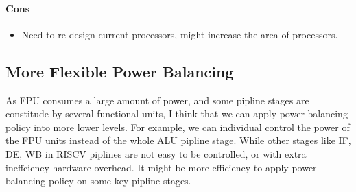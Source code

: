 \documentclass{article}
\begin{document}
\paragraph{Cons}
\begin{itemize}
    \item Need to re-design current processors, might increase the area of processors.
\end{itemize}
\subsection{More Flexible Power Balancing}
As FPU consumes a large amount of power, and some pipline stages are constitude by several functional units, I think that we can apply power balancing policy into more lower levels. For example, we can individual control the power of the FPU units instead of the whole ALU pipline stage. While other stages like IF, DE, WB in RISCV piplines are not easy to be controlled, or with extra ineffciency hardware overhead. It might be more efficiency to apply power balancing policy on some key pipline stages.  
\end{document}
